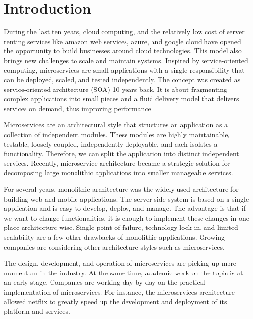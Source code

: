 
\section{Introduction}

During the last ten years, cloud computing, and the relatively low cost of server renting services like amazon web services, azure, and google cloud have opened the opportunity to build businesses around cloud technologies. This model also brings new challenges to scale and maintain systems.\cite{Claus2016} Inspired by service-oriented computing, microservices are small applications with a single responsibility that can be deployed, scaled, and tested independently. The concept was created as service-oriented architecture (SOA) 10 years back. It is about fragmenting complex applications into small pieces and a fluid delivery model that delivers services on demand, thus improving performance.\cite{Larrucea2018}

Microservices are an architectural style that structures an application as a collection of independent modules. These modules are highly maintainable, testable, loosely coupled, independently deployable, and each isolates a functionality. Therefore, we can split the application into distinct independent services.\cite{thones2015} Recently, microservice architecture became a strategic solution for decomposing large monolithic applications into smaller manageable services.\cite{Taibi2019} 

For several years, monolithic architecture was the widely-used architecture for building web and mobile applications. The server-side system is based on a single application and is easy to develop, deploy, and manage.\cite{Danbettinger2019} The advantage is that if we want to change functionalities, it is enough to implement these changes in one place architecture-wise.\cite{Pavlovic2020monolith} Single point of failure, technology lock-in, and limited scalability are a few other drawbacks of monolithic applications. Growing companies are considering other architecture styles such as microservices.\cite{Lenga2019, Jag2017, Rodrigue2016}

The design, development, and operation of microservices are picking up more momentum in the industry. At the same time, academic work on the topic is at an early stage.\cite{Soldani2018, Dragoni2017, Olaf2016} 
Companies are working day-by-day on the practical implementation of microservices.\cite{Kevin2015, Alpers2015} For instance, the microservices architecture allowed netflix\cite{Meshenberg2016} to greatly speed up the development and deployment of its platform and services.

